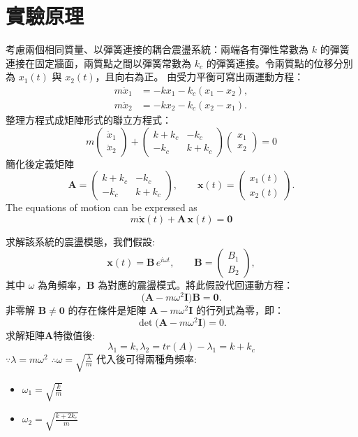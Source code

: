 \documentclass[12pt]{article}
\begin{document}
\section{\textbf{實驗原理}}
考慮兩個相同質量、以彈簧連接的耦合震盪系統：兩端各有彈性常數為 $k$ 的彈簧連接在固定牆面，兩質點之間以彈簧常數為 $k_c$ 的彈簧連接。令兩質點的位移分別為 $x_1(t)$ 與 $x_2(t)$，且向右為正。
\noindent
由受力平衡可寫出兩運動方程：
\begin{align}
m\ddot{x}_1 &= -k x_1 - k_c(x_1 - x_2), \label{eq:motion1} \\
m\ddot{x}_2 &= -k x_2 - k_c(x_2 - x_1). \label{eq:motion2}
\end{align}
整理方程式成矩陣形式的聯立方程式：
\[
m
\begin{pmatrix}
\ddot{x}_1 \\[6pt]
\ddot{x}_2
\end{pmatrix}
+
\begin{pmatrix}
k + k_c & -k_c \\[6pt]
-k_c & k + k_c
\end{pmatrix}
\begin{pmatrix}
x_1 \\[6pt]
x_2
\end{pmatrix}
= 0
\]
\noindent
簡化後定義矩陣
\[
\mathbf{A} =
\begin{pmatrix}
k + k_c & -k_c \\
-k_c & k + k_c
\end{pmatrix},
\qquad
\mathbf{x}(t) = \begin{pmatrix} x_1(t) \\ x_2(t) \end{pmatrix}.
\]
The equations of motion can be expressed as
\[
m\ddot{\mathbf{x}}(t) + \mathbf{A}\,\mathbf{x}(t) = \mathbf{0}
\]


\noindent
求解該系統的震盪模態，我們假設:
\[
\mathbf{x}(t) = \mathbf{B}\,e^{i\omega t},
\qquad \mathbf{B} = \begin{pmatrix} B_1 \\ B_2 \end{pmatrix},
\]
其中 $\omega$ 為角頻率，$\mathbf{B}$ 為對應的震盪模式。將此假設代回運動方程：
\[
\big( \mathbf{A} - m\omega^2 \mathbf{I} \big)\mathbf{B} = \mathbf{0}.
\]
\noindent
非零解 $\mathbf{B}\neq\mathbf{0}$ 的存在條件是矩陣 $\mathbf{A} - m\omega^2 \mathbf{I}$ 的行列式為零，即：
\[
\det\!\big( \mathbf{A} - m\omega^2 \mathbf{I} \big) = 0.
\]
\noindent
求解矩陣$\mathbf{A}$特徵值後:
\[ 
\lambda_1=k ,\lambda_2=tr(A)-\lambda_1=k+k_c
\]
$\because\lambda=m\omega^2$
$\therefore\omega=\sqrt{\frac{\lambda}{m}}$
代入後可得兩種角頻率:
\begin{itemize}
    \item $\omega_1=\sqrt{\frac{k}{m}}$
    \item $\omega_2=\sqrt{\frac{k+2k_c}{m}}$
\end{itemize}
\end{document}
